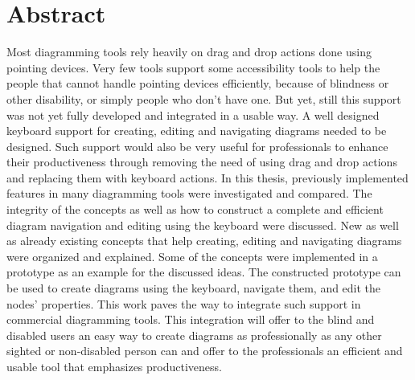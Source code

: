 \chapter*{Abstract}
\beginchapter

\vspace{1.5cm}

\begin{spacing}{1.5}
Most diagramming tools rely heavily on drag and drop actions done using pointing devices. Very few tools support some accessibility tools to help the people that cannot handle pointing devices efficiently, because of blindness or other disability, or simply people who don't have one. But yet, still this support was not yet fully developed and integrated in a usable way. A well designed keyboard support for creating, editing and navigating diagrams needed to be designed. Such support would also be very useful for professionals to enhance their productiveness through removing the need of using drag and drop actions and replacing them with keyboard actions. In this thesis, previously implemented features in many diagramming tools were investigated and compared. The integrity of the concepts as well as how to construct a complete and efficient diagram navigation and editing using the keyboard were discussed. New as well as already existing concepts that help creating, editing and navigating diagrams were organized and explained. Some of the concepts were implemented in a prototype as an example for the discussed ideas. The constructed prototype can be used to create diagrams using the keyboard, navigate them, and edit the nodes' properties. This work paves the way to integrate such support in commercial diagramming tools. This integration will offer to the blind and disabled users an easy way to create diagrams as professionally as any other sighted or non-disabled person can and offer to the professionals an efficient and usable tool that emphasizes productiveness.
\end{spacing}
